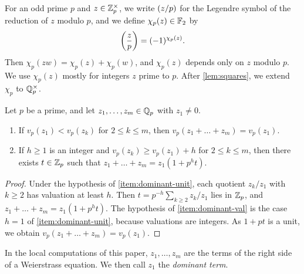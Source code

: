For an odd prime $p$ and $z\in\mathbb Z_p^\times$, we write $\leg zp$ for the Legendre symbol of the reduction of $z$ modulo $p$, and we define $\chi_p(z)\in\mathbb F_2$ by
\begin{equation}\label{eq:chi-def}
\leg zp=(-1)^{\chi_p(z)}.
\end{equation}
Then $\chi_p(zw)=\chi_p(z)+\chi_p(w)$, and $\chi_p(z)$ depends only on $z$ modulo $p$. We use $\chi_p(z)$ mostly for integers $z$ prime to $p$. After \cref{lem:squares}, we extend $\chi_p$ to $\mathbb Q_p^\times$.

\begin{lemma}\label{lem:dominant}
Let $p$ be a prime, and let $z_1,\dots,z_m\in\mathbb Q_p$ with $z_1\ne0$.
\begin{enumerate}[label=(\alph*),ref=(\alph*)]
\item\label{item:dominant-val} If $v_p(z_1)<v_p(z_k)$ for $2\le k\le m$, then $v_p(z_1+\dots+z_m)=v_p(z_1)$.
\item\label{item:dominant-unit} If $h\ge1$ is an integer and $v_p(z_k)\ge v_p(z_1)+h$ for $2\le k\le m$, then there exists $t\in\mathbb Z_p$ such that $z_1+\dots+z_m=z_1(1+p^ht)$.
\end{enumerate}
\end{lemma}

\begin{proof}
Under the hypothesis of \ref{item:dominant-unit}, each quotient $z_k/z_1$ with $k\ge2$ has valuation at least $h$. Then $t=p^{-h}\sum_{k\ge2}z_k/z_1$ lies in $\mathbb Z_p$, and $z_1+\dots+z_m=z_1(1+p^ht)$. The hypothesis of \ref{item:dominant-val} is the case $h=1$ of \ref{item:dominant-unit}, because valuations are integers. As $1+pt$ is a unit, we obtain $v_p(z_1+\dots+z_m)=v_p(z_1)$.
\end{proof}

In the local computations of this paper, $z_1,\dots,z_m$ are the terms of the right side of a Weierstrass equation. We then call $z_1$ the \emph{dominant term}.

